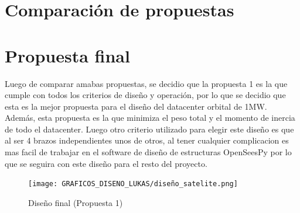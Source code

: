 \newpage
\section{Comparación de propuestas}


\newpage
\section{Propuesta final}

Luego de comparar amabas propuestas, se decidio que la propuesta 1 es la que cumple con todos los criterios de diseño y operación, por lo que se decidio que esta es la mejor propuesta para el diseño del datacenter orbital de 1MW. Además, esta propuesta es la que minimiza el peso total y el momento de inercia de todo el datacenter. Luego otro criterio utilizado para elegir este diseño es que al ser 4 brazos independientes unos de otros, al tener cualquier complicacion es mas facil de trabajar en el software de diseño de estructuras OpenSeesPy por lo que se seguira con este diseño para el resto del proyecto.

\begin{figure}[H]
    \centering
    \texttt{[image: GRAFICOS\_DISENO\_LUKAS/diseño\_satelite.png]}
    \caption{Diseño final (Propuesta 1)}
    \label{fig:propuesta1}
\end{figure}

